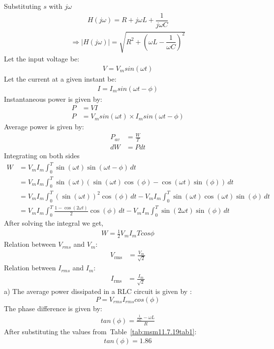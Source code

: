 \documentclass[journal,12pt,onecolumn]{IEEEtran}
\newcommand\tabref{Table~\ref}
\providecommand{\brak}[1]{\ensuremath{\left(#1\right)}}
\theoremstyle{remark}
\begin{document}
Substituting $s$ with $j \omega$
\begin{align}
	H(j\omega) = R + j\omega L + \dfrac{1}{j\omega C}
\end{align}
\begin{align}
	\Rightarrow \lvert H(j\omega) \rvert = \sqrt{R^2 + \left(\omega L - \dfrac{1}{\omega C}\right)^2}
\end{align}
Let the input voltage be:
\begin{align}
	V=V_{m}sin\brak{\omega t}
\end{align}
Let the current at a given instant be:
\begin{align}
	I=I_{m}sin\brak{\omega t - \phi}
\end{align}
Instantaneous power is given by:
\begin{align}
	P &= VI\\
	P &= V_{m}sin\brak{\omega t} \times I_{m}sin\brak{\omega t - \phi}
\end{align}
Average power is given by:
\begin{align}
	P_{av} &= \frac{W}{T}\\
	dW &= Pdt
\end{align}
Integrating on both sides 
\begin{align}
	W &= V_{m}I_{m} \int_{0}^{T} \sin\brak{\omega t} \sin\brak{\omega t - \phi} \, dt \\
	&= V_{m}I_{m} \int_{0}^{T} \sin\brak{\omega t}\brak{\sin(\omega t)\cos(\phi) - \cos(\omega t)\sin(\phi)} \, dt \\
	&= V_{m}I_{m} \int_{0}^{T} (\sin(\omega t))^2\cos(\phi) \, dt - V_{m}I_{m} \int_{0}^{T} \sin(\omega t)\cos(\omega t)\sin(\phi) \, dt \\
	&= V_{m}I_{m} \int_{0}^{T} \frac{1 - \cos(2\omega t)}{2}\cos(\phi) \, dt - V_{m}I_{m} \int_{0}^{T} \sin(2\omega t)\sin(\phi) \, dt
\end{align}
After solving the integral we get,
\begin{align}
	W=\frac{1}{2}V_{m}I_{m}Tcos{\phi}
\end{align}
Relation between $V_{rms}$ and $V_m$:
\begin{align}
	V_{\text{rms}} &= \frac{V_{m}}{\sqrt{2}}
\end{align}	
Relation between $I_{rms}$ and $I_m$:
\begin{align}
	I_{\text{rms}} &= \frac{I_{m}}{\sqrt{2}}
\end{align}
a) The average power dissipated in a RLC circuit is given by :
\begin{equation}
	P=V_{rms} I_{rms} cos(\phi) 
	\label{eq:msm11.7.19eq1}
\end{equation}
The phase difference is given by:
\begin{align}
	tan\brak{\phi} = \frac{\frac{1}{\omega C}-\omega L}{R}
\end{align}
After substituting the values from~\tabref{tab:msm11.7.19tab1}:
\begin{align}
	tan\brak{\phi} = 1.86
\end{align}
\end{document}
